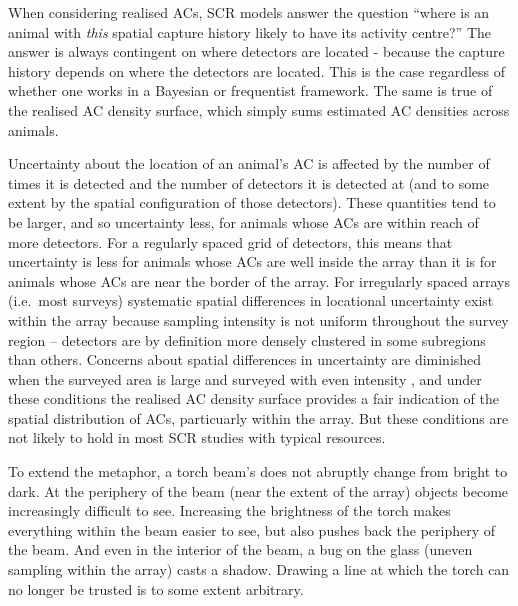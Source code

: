 \documentclass[useAMS,usenatbib,referee]{biom}
\begin{document}
When considering realised ACs, SCR models answer the question ``where is an animal with {\it this} spatial capture history likely to have its activity centre?'' The answer is always contingent on where detectors are located - because the capture history depends on where the detectors are located. This is the case regardless of whether one works in a Bayesian or frequentist framework. The same is true of the realised AC density surface, which simply sums estimated AC densities across animals. 

Uncertainty about the location of an animal's AC is affected by the number of times it is detected and the number of detectors it is detected at (and to some extent by the spatial configuration of those detectors). These quantities tend to be larger, and so uncertainty less, for animals whose ACs are within reach of more detectors. For a regularly spaced grid of detectors, this means that uncertainty is less for animals whose ACs are well inside the array than it is for animals whose ACs are near the border of the array. For irregularly spaced arrays (i.e.\ most surveys) systematic spatial differences in locational uncertainty exist within the array because sampling intensity is not uniform throughout the survey region -- detectors are by definition more densely clustered in some subregions than others. Concerns about spatial differences in uncertainty are diminished when the surveyed area is large and surveyed with even intensity \citep[e.g.][]{Bischof2020}, and under these conditions the realised AC density surface provides a fair indication of the spatial distribution of ACs, particuarly within the array. But these conditions are not likely to hold in most SCR studies with typical resources.

To extend the metaphor, a torch beam's does not abruptly change from bright to dark. At the periphery of the beam (near the extent of the array) objects become increasingly difficult to see. Increasing the brightness of the torch makes everything within the beam easier to see, but also pushes back the periphery of the beam. And even in the interior of the beam, a bug on the glass (uneven sampling within the array) casts a shadow. Drawing a line at which the torch can no longer be trusted is to some extent arbitrary. 
\end{document}

